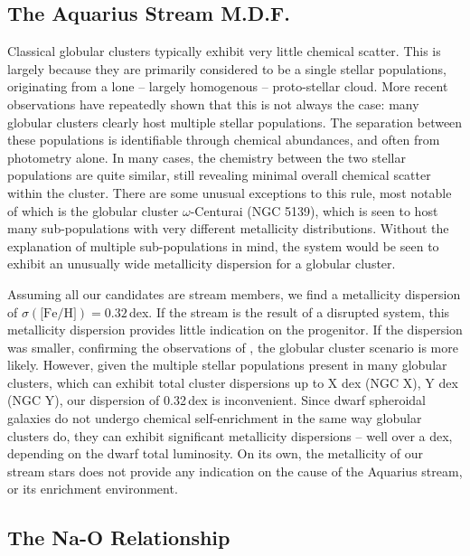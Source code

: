 \documentclass{emulateapj}
\begin{document}
\subsection{The Aquarius Stream M.D.F.}

Classical globular clusters typically exhibit very little chemical scatter. This is largely because they are primarily considered to be a single stellar populations, originating from a lone \--- largely homogenous \--- proto-stellar cloud. More recent observations have repeatedly shown that this is not always the case: many globular clusters clearly host multiple stellar populations. The separation between these populations is identifiable through chemical abundances, and often from photometry alone. In many cases, the chemistry between the two stellar populations are quite similar, still revealing minimal overall chemical scatter within the cluster. There are some unusual exceptions to this rule, most notable of which is the globular cluster $\omega$-Centurai (NGC 5139), which is seen to host many sub-populations with very different metallicity distributions. Without the explanation of multiple sub-populations in mind, the system would be seen to exhibit an unusually wide metallicity dispersion for a globular cluster.

Assuming all our candidates are stream members, we find a metallicity dispersion of $\sigma(\mbox{[Fe/H]}) = 0.32$\,dex. If the stream is the result of a disrupted system, this metallicity dispersion provides little indication on the progenitor. If the dispersion was smaller, confirming the observations of \citet{wylie-de-boer;et-al_2012}, the globular cluster scenario is  more likely. However, given the multiple stellar populations present in many globular clusters, which can exhibit total cluster dispersions up to X dex (NGC X), Y dex (NGC Y), our dispersion of 0.32\,dex is inconvenient. Since dwarf spheroidal galaxies do not undergo chemical self-enrichment in the same way globular clusters do, they can exhibit significant metallicity dispersions \--- well over a dex, depending on the dwarf total luminosity. On its own, the metallicity of our stream stars does not provide any indication on the cause of the Aquarius stream, or its enrichment environment.


\subsection{The Na-O Relationship}

\end{document}
